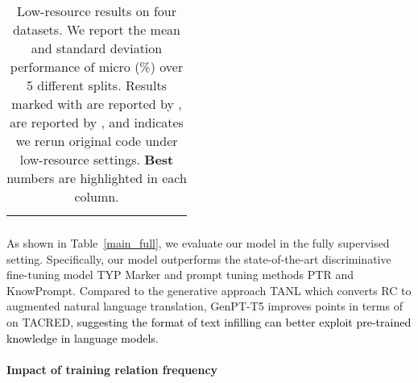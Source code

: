 \documentclass[11pt]{article}
\begin{document}
\begin{table*}[thbp]
{\begin{tabular}{llcccccccccccc}
		&		&\small{\textcolor{white}{}}&\small{\textcolor{white}{}}&\small{\textcolor{white}{}}&\small{\textcolor{white}{}}&\small{\textcolor{white}{}}&\small{\textcolor{white}{}}&\small{\textcolor{white}{}}&\small{}&\small{\textcolor{white}{}}&\small{\textcolor{white}{}}&\small{\textcolor{white}{}}&\small{\textcolor{white}{}}\\
		\bottomrule
	\end{tabular}
}
\caption{Low-resource results on four datasets. We report the mean and standard deviation performance of micro  (\%) over 5 different splits. 
	Results marked with  are reported by \citet{DBLP:journals/corr/abs-2104-07650},   are reported by \citet{DBLP:journals/corr/abs-2105-11259}, and  indicates we rerun original code under low-resource settings. \textbf{Best} numbers are highlighted in each column.}
\label{main_low}
\end{table*}

As shown in Table~\ref{main_full}, we evaluate our model in the fully supervised setting. Specifically, our model outperforms the state-of-the-art discriminative fine-tuning model TYP Marker and prompt tuning methods PTR and KnowPrompt. Compared to the generative approach TANL which converts RC to augmented natural language translation, GenPT-T5 improves  points in terms of  on TACRED, \textcolor{black}{suggesting the format of text infilling can better exploit pre-trained knowledge in language models}.
\paragraph{Impact of training relation frequency}
\end{document}
